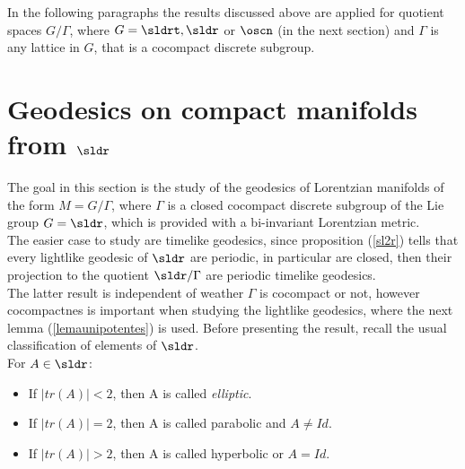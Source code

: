 \documentclass[11pt]{amsart}
\newcommand\myworries[1]{\textcolor{red}{#1}}
\theoremstyle{plain}
\newtheorem{thm}{Theorem}[section]
\theoremstyle{definition}
\theoremstyle{remark}
\begin{document}




In the following paragraphs the results discussed above are applied for quotient spaces $G/\Gamma$, where $G=\sldrt, \sldr$ or $\oscn$ (in the next section) and $\Gamma$ is any lattice in $G$, that is a cocompact discrete subgroup. 


\section{Geodesics on  compact manifolds from $\sldr$}

The goal in this section is the study of the geodesics of Lorentzian manifolds of the form $M=G/\Gamma$, where $\Gamma$ is a closed cocompact discrete subgroup of the Lie group $G=\sldr$, which is provided with a bi-invariant Lorentzian metric. \\

The easier case to study are timelike geodesics, since proposition (\ref{sl2r}) tells that every lightlike geodesic of $\sldr$ are periodic, in particular are closed, then their projection to the quotient $\sldr / \Gamma$ are periodic timelike geodesics. \\ 

The latter result is independent of weather $\Gamma$ is cocompact or not, however cocompactnes is important when studying the lightlike geodesics, where the next lemma (\ref{lemaunipotentes}) is used. Before presenting the result, recall the usual classification of elements of $\sldr$.\\

 For $A \in \sldr$:
 \begin{itemize}
 \item    If $| tr(A) | < 2$, then A is called {\em elliptic}.
 \item     If $| tr(A) | = 2$, then A is called parabolic and $A \neq Id$.
 \item     If $| tr(A) | > 2$, then A is called hyperbolic or $A = Id$.
 \end{itemize}
\end{document}
